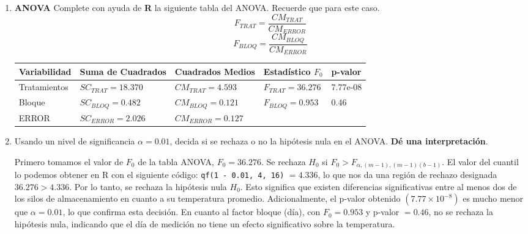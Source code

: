 \documentclass[12pt,a4paper]{article}
\begin{document}
\begin{enumerate}
  \item \textbf{ANOVA} Complete con ayuda de \textbf{R} la siguiente tabla del ANOVA. Recuerde que para este caso.
  \[
    F_{TRAT} = \frac{CM_{TRAT}}{CM_{ERROR}} 
  \]
  \[
    F_{BLOQ} = \frac{CM_{BLOQ}}{CM_{ERROR}}
  \]
  \begin{table}[H]
      \centering
      \begin{tabular}{@{}lllll@{}}
      \toprule
      Variabilidad & Suma de Cuadrados & Cuadrados Medios & Estadístico $F_0$ & p-valor \\ \midrule
      Tratamientos & $SC_{TRAT}=18.370$ & $CM_{TRAT}=4.593$ & $F_{TRAT}=36.276$ & 7.77e-08\\
      Bloque & $SC_{BLOQ}=0.482$ & $CM_{BLOQ}=0.121$ & $F_{BLOQ}=0.953$ & 0.46\\
      ERROR & $SC_{ERROR}=2.026$ & $CM_{ERROR}=0.127$ & & \\ \bottomrule
      \end{tabular}
  \end{table}

  \item Usando un nivel de significancia \(\alpha=0.01\), decida si se rechaza o no la hipótesis nula en el ANOVA. \textbf{Dé una interpretación}. 
  
  Primero tomamos el valor de $F_0$ de la tabla ANOVA, $F_0 = 36.276$. Se rechaza $H_0$ si $F_0 > F_{\alpha,(m-1),(m-1)(b-1)}$. El valor del cuantil lo podemos obtener en R con el siguiente código: \texttt{qf(1 - 0.01, 4, 16)} $= 4.336$, lo que nos da una región de rechazo designada $36.276 > 4.336$. Por lo tanto, se rechaza la hipótesis nula $H_0$. Esto significa que existen diferencias significativas entre al menos dos de los silos de almacenamiento en cuanto a su temperatura promedio. Adicionalmente, el p-valor obtenido $(7.77\times10^{-8})$ es mucho menor que $\alpha = 0.01$, lo que confirma esta decisión. En cuanto al factor bloque (día), con $F_0 = 0.953$ y p-valor $= 0.46$, no se rechaza la hipótesis nula, indicando que el día de medición no tiene un efecto significativo sobre la temperatura.
  


\end{enumerate}
\end{document}
